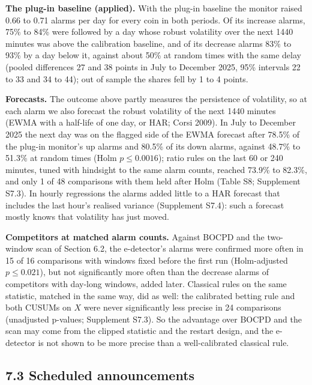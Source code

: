 \documentclass[
]{article}
\begin{document}
\textbf{The plug-in baseline (applied).} With the plug-in baseline the
monitor raised 0.66 to 0.71 alarms per day for every coin in both
periods. Of its increase alarms, 75\% to 84\% were followed by a day
whose robust volatility over the next 1440 minutes was above the
calibration baseline, and of its decrease alarms 83\% to 93\% by a day
below it, against about 50\% at random times with the same delay (pooled
differences 27 and 38 points in July to December 2025, 95\% intervals 22
to 33 and 34 to 44); out of sample the shares fell by 1 to 4 points.

\textbf{Forecasts.} The outcome above partly measures the persistence of
volatility, so at each alarm we also forecast the robust volatility of
the next 1440 minutes (EWMA with a half-life of one day, or HAR; Corsi
2009). In July to December 2025 the next day was on the flagged side of
the EWMA forecast after 78.5\% of the plug-in monitor's up alarms and
80.5\% of its down alarms, against 48.7\% to 51.3\% at random times
(Holm \(p \le 0.0016\)); ratio rules on the last 60 or 240 minutes,
tuned with hindsight to the same alarm counts, reached 73.9\% to 82.3\%,
and only 1 of 48 comparisons with them held after Holm (Table S8;
Supplement S7.3). In hourly regressions the alarms added little to a HAR
forecast that includes the last hour's realised variance (Supplement
S7.4): such a forecast mostly knows that volatility has just moved.

\textbf{Competitors at matched alarm counts.} Against BOCPD and the
two-window scan of Section 6.2, the e-detector's alarms were confirmed
more often in 15 of 16 comparisons with windows fixed before the first
run (Holm-adjusted \(p \le 0.021\)), but not significantly more often
than the decrease alarms of competitors with day-long windows, added
later. Classical rules on the same statistic, matched in the same way,
did as well: the calibrated betting rule and both CUSUMs on \(X\) were
never significantly less precise in 24 comparisons (unadjusted p-values;
Supplement S7.3). So the advantage over BOCPD and the scan may come from
the clipped statistic and the restart design, and the e-detector is not
shown to be more precise than a well-calibrated classical rule.

\hypertarget{scheduled-announcements}{%
\subsection{7.3 Scheduled announcements}\label{scheduled-announcements}}
\end{document}
